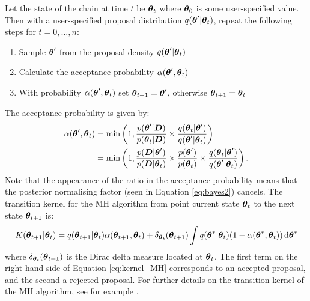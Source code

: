 Let the state of the chain at time \(t\) be \(\boldsymbol{\theta}_t\) where \(\boldsymbol{\theta}_0\) is some user-specified value. Then
with a user-specified proposal distribution \(q(\boldsymbol{\theta}'|\boldsymbol{\theta}_t)\), repeat the following steps for \(t=0,
\ldots, n\):
\begin{enumerate} 
  \item Sample \(\boldsymbol{\theta}'\) from the proposal density \(q(\boldsymbol{\theta}'|\boldsymbol{\theta}_t)\)
  \item Calculate the acceptance probability \(\alpha(\boldsymbol{\theta}', \boldsymbol{\theta}_t)\)
  \item With probability \(\alpha(\boldsymbol{\theta}', \boldsymbol{\theta}_t)\) set \(\boldsymbol{\theta}_{t+1} = \boldsymbol{\theta}'\), otherwise \(\boldsymbol{\theta}_{t+1} =
  \boldsymbol{\theta}_t\)
\end{enumerate}
The acceptance probability is given by:
\begin{align} 
\alpha(\boldsymbol{\theta}', \boldsymbol{\theta}_t) &= \min\left(1, 
\frac{p(\boldsymbol{\theta}' | \boldsymbol{D})}{p(\boldsymbol{\theta}_t | \boldsymbol{D})} \times \frac{q(\boldsymbol{\theta}_t | \boldsymbol{\theta}')}{q(\boldsymbol{\theta}' |
\boldsymbol{\theta}_t)} \right)\notag \\ 
&= \min\left(1, 
\frac{p(\boldsymbol{D} | \boldsymbol{\theta}')}{p(\boldsymbol{D} | \boldsymbol{\theta}_t)} \times \frac{p(\boldsymbol{\theta}')}{p(\boldsymbol{\theta}_t)} \times \frac{q(\boldsymbol{\theta}_t |
\boldsymbol{\theta}')} { q(\boldsymbol{\theta}' | \boldsymbol{\theta}_t)}
\right).
\end{align}
Note that the appearance of the ratio in the acceptance probability means that the posterior normalising factor (seen in
Equation \eqref{eq:bayes2}) cancels. The transition kernel for the \gls{MH} algorithm from point current state
\(\boldsymbol{\theta}_t\) to the next state \(\boldsymbol{\theta}_{t+1}\) is:
\begin{align} 
\label{eq:kernel_MH}
K(\boldsymbol{\theta}_{t+1} | \boldsymbol{\theta}_t) = q(\boldsymbol{\theta}_{t+1} | \boldsymbol{\theta}_t) \alpha(\boldsymbol{\theta}_{t+1}, \boldsymbol{\theta}_t) + \delta_{\boldsymbol{\theta}_t}(\boldsymbol{\theta}_{t+1})
\int q(\boldsymbol{\theta}^* | \boldsymbol{\theta}_t) (1 - \alpha(\boldsymbol{\theta}^*, \boldsymbol{\theta}_t)) \, \mathrm{d}\boldsymbol{\theta}^*
\end{align}
where \(\delta_{\boldsymbol{\theta}_t}(\boldsymbol{\theta}_{t+1})\) is the Dirac delta measure located at \(\boldsymbol{\theta}_t\). The 
first term on the right hand side of Equation \eqref{eq:kernel_MH} corresponds to an accepted proposal, and the second a
rejected proposal. For further details on the transition kernel of the \gls{MH} algorithm, see for example
\cite{tierney1998}.

